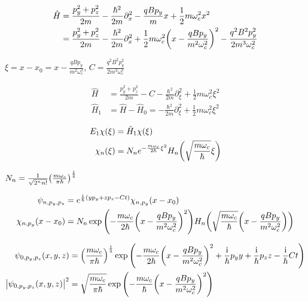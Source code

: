 \documentclass[a4paper,10pt]{article}
\newcommand{\mi}{\mathrm{i}}
\begin{document}
\begin{align}
	\hat{H}    
    &=
    \frac{p_y^2+p_z^2}{2m}
	-
    \frac{\hbar^2}{2m}    
    \partial_x^2
    -
    \frac{qBp_y}{m}
    x
    +
    \frac{1}{2}
    m\omega_c^2
    x^2
\\
	&=
    \frac{p_y^2+p_z^2}{2m}
	-
    \frac{\hbar^2}{2m}    
    \partial_x^2
	+
    \frac{1}{2}
    m\omega_c^2
	\pqty{
		x
		-
		\frac{qBp_y}{m^2\omega_c^2}
	}^2
	-
	\frac{q^2 B^2 p_y^2}{2m^3\omega_c^2}
\end{align}

$\xi = x-x_0=x-\frac{qBp_y}{m^2\omega_c^2}$, $C=\frac{q^2 B^2 p_y^2}{2m^3\omega_c^2}$

\begin{align}
	\hat{H}
	&=
    \frac{p_y^2+p_z^2}{2m}
	-
	C
	-
    \frac{\hbar^2}{2m}    
    \partial_\xi^2
	+
	\frac{1}{2}
	m
	\omega_c^2
	\xi^2
\\
	\hat{H}_1
	&=	
	\hat{H}-\hat{H}_0
	=
	-
    \frac{\hbar^2}{2m}    
    \partial_\xi^2
	+
	\frac{1}{2}
	m
	\omega_c^2
	\xi^2
\end{align}


\begin{align}
	E_1
	\chi(\xi)
	&=
	\hat{H}_1
	\chi(\xi)
\\
	\chi_n(\xi)
	&=
	N_n
	e^{-\frac{m\omega_c}{2\hbar}\xi^2}
	H_n\pqty{
		\sqrt{
			\frac{m\omega_c}{\hbar}	
		}
		\xi
	}
\end{align}

$N_n=\frac{1}{\sqrt{2^n n!}}\pqty{\frac{m\omega_c}{\pi\hbar}}^{\frac{1}{4}}$

\begin{align}
	\psi_{n,p_y,p_z}
	&=
	e^{\frac{\mi}{\hbar}(yp_y+zp_z-Ct)}
	\chi_{n,p_y}
	(x-x_0)
\\
	\chi_{n,p_y}
	(x-x_0)
	&=
	N_n
	\exp
	\pqty{
		-
		\frac{m\omega_c}{2\hbar}
		\pqty{
			x-\frac{qBp_y}{m^2\omega_c^2}		
		}^2
	}
	H_n\pqty{
		\sqrt{
			\frac{m\omega_c}{\hbar}	
		}
		\pqty{
			x-\frac{qBp_y}{m^2\omega_c^2}		
		}
	}
\end{align}

\begin{align}
	\psi_{0,p_y,p_z}
	(x,y,z)
	&=
	\pqty{
		\frac{m\omega_c}{\pi\hbar}
	}^{\frac{1}{4}}
	\exp
	\pqty{
		-
		\frac{m\omega_c}{2\hbar}
		\pqty{
			x-\frac{qBp_y}{m^2\omega_c^2}
		}^2
		+
		\frac{\mi}{\hbar}
		p_y y
		+
		\frac{\mi}{\hbar}
		p_z z
		-
		\frac{\mi}{\hbar}
		Ct
	}
\\
	\abs{
		\psi_{0,p_y,p_z}
		(x,y,z)
	}^2
	&=
	\sqrt{
		\frac{m\omega_c}{\pi\hbar}
	}
	\exp
	\pqty{
		-
		\frac{m\omega_c}{\hbar}
		\pqty{
			x-\frac{qBp_y}{m^2\omega_c^2}
		}^2
	}	
\end{align}
\end{document}
